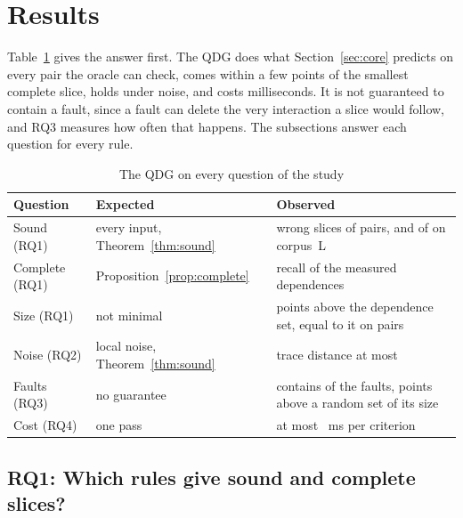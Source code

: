 \section{Results}\label{sec:results}

Table~\ref{tab:scorecard} gives the answer first. The QDG does what Section~\ref{sec:core} predicts on every pair the
oracle can check, comes within a few points of the smallest complete slice, holds under noise, and costs milliseconds.
It is not guaranteed to contain a fault, since a fault can delete the very interaction a slice would follow, and RQ3
measures how often that happens. The subsections answer each question for every rule.

\begin{table}[t]
  \centering
  \caption{The QDG on every question of the study}
  \label{tab:scorecard}
  \footnotesize\setlength{\tabcolsep}{3pt}\renewcommand{\arraystretch}{1.12}
  \newcommand{\sep}{\arrayrulecolor{black!25}\hline\arrayrulecolor{black}}
  \begin{tabular}{@{}l >{\raggedright\arraybackslash}p{2.0cm} >{\raggedright\arraybackslash}p{4.15cm}@{}}
    \toprule
    \textbf{Question} & \textbf{Expected} & \textbf{Observed} \\
    \midrule
    Sound (RQ1) & every input, Theorem~\ref{thm:sound} & \numRqOneLcUnsound{} wrong slices of \numNPairs{} pairs, and of \numCorpusLSoundPairs{} on corpus~L \\ \sep
    Complete (RQ1) & Proposition~\ref{prop:complete} & recall \numRqOneLcRecall{} of the measured dependences \\ \sep
    Size (RQ1) & not minimal & \numLcExcess{} points above the dependence set, equal to it on \numLcExact{} pairs \\ \sep
    Noise (RQ2) & local noise, Theorem~\ref{thm:sound} & trace distance at most \numNoiseLcCrossExactMax{} \\ \sep
    Faults (RQ3) & no guarantee & contains \numRqThreeContainLc{} of the faults, \numSizeCtlLcGain{} points above a random set of its size \\ \sep
    Cost (RQ4) & one pass & at most \numCostLcMaxCritMs{}~ms per criterion \\
    \bottomrule
  \end{tabular}
\end{table}

\subsection{RQ1: Which rules give sound and complete slices?}

